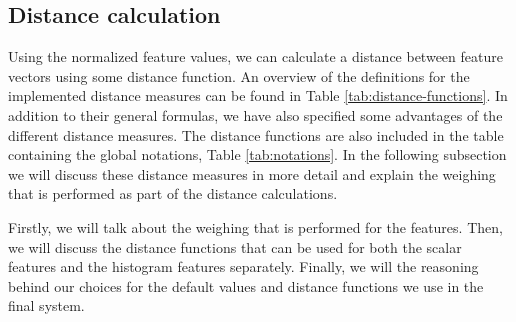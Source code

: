 \subsection{Distance calculation}
Using the normalized feature values, we can calculate a distance between feature vectors using some distance function.
An overview of the definitions for the implemented distance measures can be found in Table \ref{tab:distance-functions}.
In addition to their general formulas, we have also specified some advantages of the different distance measures.
The distance functions are also included in the table containing the global notations, Table \ref{tab:notations}.
In the following subsection we will discuss these distance measures in more detail and explain the weighing that is
performed as part of the distance calculations.

Firstly, we will talk about the weighing that is performed for the features.
Then, we will discuss the distance functions that can be used for both the scalar features and the histogram
features separately.
Finally, we will the reasoning behind our choices for the default values and distance functions we use in the final
system.

